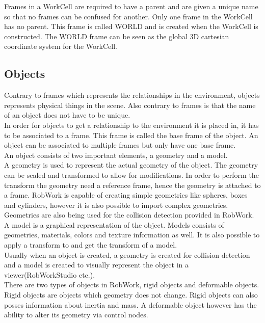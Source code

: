 Frames in a WorkCell are required to have a parent and are given a unique name so that no frames can be confused for another. Only one frame in the WorkCell has no parent. This frame is called WORLD and is created when the WorkCell is constructed. The WORLD frame can be seen as the global 3D cartesian coordinate system for the WorkCell.


\subsection{Objects}
Contrary to frames which represents the relationships in the environment, objects represents physical things in the scene. Also contrary to frames is that the name of an object does not have to be unique.\\

In order for objects to get a relationship to the environment it is placed in, it has to be associated to a frame. This frame is called the base frame of the object. An object can be associated to multiple frames but only have one base frame.\\

An object consists of two important elements, a geometry and a model.\\
A geometry is used to represent the actual geometry of the object. The geometry can be scaled and transformed to allow for modifications. In order to perform the transform the geometry need a reference frame, hence the geometry is attached to a frame. RobWork is capable of creating simple geometries like spheres, boxes and cylinders, however it is also possible to import complex geometries. Geometries are also being used for the collision detection provided in RobWork.\\
A model is a graphical representation of the object. Models consists of geometries, materials, colors and texture information as well. It is also possible to apply a transform to and get the transform of a model.\\
Usually when an object is created, a geometry is created for collision detection and a model is created to visually represent the object in a viewer(RobWorkStudio etc.).\\

There are two types of objects in RobWork, rigid objects and deformable objects. Rigid objects are objects which  geometry does not change. Rigid objects can also posses information about inertia and mass. A deformable object however has the ability to alter its geometry via control nodes.


